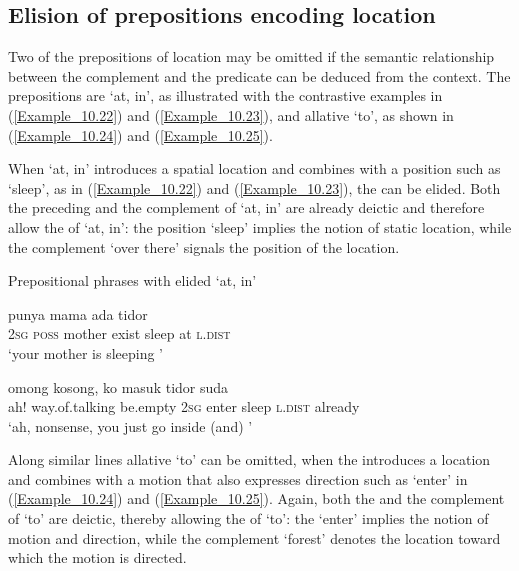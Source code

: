 \subsection{Elision of prepositions encoding location}
\label{Para_10.1.5}
Two of the prepositions of location may be omitted if the semantic relationship between the complement and the predicate can be deduced from the context. The prepositions are   ‘at, in’, as illustrated with the contrastive examples in (\ref{Example_10.22}) and (\ref{Example_10.23}), and allative  ‘to’, as shown in (\ref{Example_10.24}) and (\ref{Example_10.25}).



When   ‘at, in’ introduces a spatial location and combines with a position  such as  ‘sleep’, as in (\ref{Example_10.22}) and (\ref{Example_10.23}), the  can be elided. Both the preceding  and the complement of  ‘at, in’ are already deictic and therefore allow the  of  ‘at, in’: the position   ‘sleep’ implies the notion of static location, while the complement  ‘over there’ signals the position of the location.


\begin{styleExampleTitle}
Prepositional phrases with elided   ‘at, in’
\end{styleExampleTitle}
\ea
\label{Example_10.22}
 {punya} {mama} {ada} {tidor} {} {}\\ %
 \textsc{2sg}  \textsc{poss}  mother  exist  sleep  at  \textsc{l.dist}\\
\glt 
‘your mother is sleeping ’ \textstyleExampleSource{[081006-025-CvEx.0007]}
\z

\ea
\label{Example_10.23}
 {omong} {kosong,} {ko} {masuk} {tidor} {} {} {suda}\\ %
 ah!  way.of.talking  be.empty  \textsc{2sg}  enter  sleep  {}  \textsc{l.dist}  already\\
\glt 
‘ah, nonsense, you just go inside (and) ’ \textstyleExampleSource{[081023-001-Cv.0057]}
\z


Along similar lines allative  ‘to’ can be omitted, when the  introduces a location and combines with a motion  that also expresses direction such as  ‘enter’ in (\ref{Example_10.24}) and (\ref{Example_10.25}). Again, both the  and the complement of  ‘to’ are deictic, thereby allowing the  of  ‘to’: the   ‘enter’ implies the notion of motion and direction, while the complement  ‘forest’ denotes the location toward which the motion is directed.



